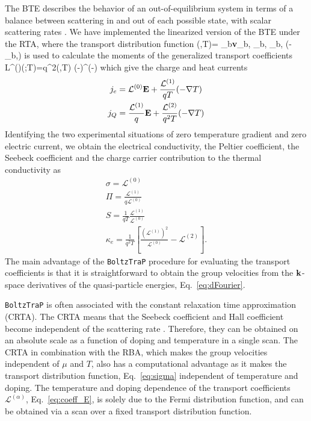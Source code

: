 \documentclass[final,5p,times,twocolumn,sort&compress]{elsarticle}
\newcounter{bla}
\begin{document}
The BTE describes the behavior of an out-of-equilibrium system in terms of a balance between scattering in and out of each possible state, with scalar scattering rates \cite{Ziman_book}. We have implemented the linearized version of the BTE under the RTA, where the transport distribution function
\beq
\sigma(\varepsilon,T)= \int  \sum\limits_b{\bf v}_{b,\bk} _{b,\bk} \tau_{b,\bk} \delta(\varepsilon-\varepsilon_{b,\bk}) 
\label{eq:sigma}
\eeq
is used to calculate the moments of the generalized transport coefficients
\beq
{\mathcal L}^{(\alpha)}(\mu;T)=q^2\int \sigma(\varepsilon,T) (\varepsilon-\mu)^\alpha\left(-\right)\id\varepsilon
\label{eq:coeff_E}
\eeq
which give the charge and heat currents
\begin{gather}
j_e=\mathcal{L}^{(0)}{\bf E}+\frac{\mathcal{L}^{(1)}}{qT}(-\nabla T)\\
j_Q=\frac{\mathcal{L}^{(1)}}{q}{\bf E}+\frac{\mathcal{L}^{(2)}}{q^2T}(-\nabla T)
\end{gather}
Identifying the two experimental situations of zero temperature gradient and zero electric current, we obtain the electrical conductivity, the Peltier coefficient, the Seebeck coefficient and the charge carrier contribution to the thermal conductivity as
\begin{gather}
  \sigma=\mathcal{L}^{(0)} \label{eq:cond} \\
  \Pi=\frac{\mathcal{L}^{(1)}}{q\mathcal{L}^{(0)}} \label{eq:Peltier}\\
  S=\frac{1}{qT}\frac{\mathcal{L}^{(1)}}{\mathcal{L}^{(0)}} \label{eq:Seebeck}\\
  \kappa_e=\frac{1}{q^2T}\left[\frac{(\mathcal{L}^{(1)})^2}{\mathcal{L}^{(0)}} -\mathcal{L}^{(2)}\right]. \label{eq:kappae}
\end{gather}
 The main advantage of the \texttt{BoltzTraP} procedure for evaluating the transport coefficients is that it is straightforward to obtain the group velocities from the ${\bf k}$-space derivatives of the quasi-particle energies, Eq.~\eqref{eq:dFourier}.

\texttt{BoltzTraP} is often associated with the constant relaxation time approximation (CRTA). The CRTA means that the Seebeck coefficient and Hall coefficient become independent of the scattering rate \cite{Singh_PRB97}. Therefore, they can be obtained on an absolute scale as a function of doping and temperature in a single scan. The CRTA in combination with the RBA, which makes the group velocities independent of $\mu$ and $T$, also has a computational advantage as it makes the transport distribution function, Eq.~\eqref{eq:sigma} independent of temperature and doping. The temperature and doping dependence of the transport coefficients ${\mathcal L}^{(\alpha)}$, Eq.~\eqref{eq:coeff_E}, is solely due to the Fermi distribution function, and can be obtained via a scan over a fixed transport distribution function.
\end{document}
